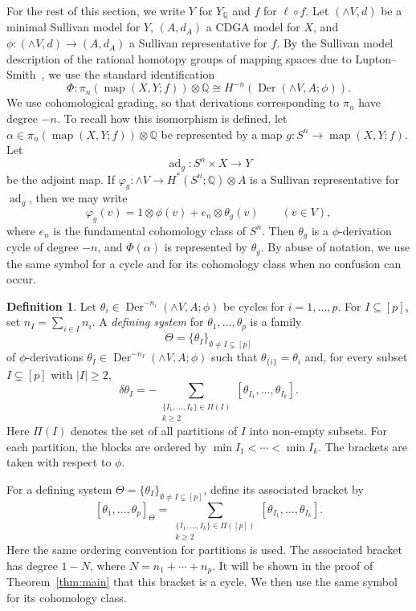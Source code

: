 \documentclass[a4paper,10pt]{amsart}
\theoremstyle{definition}
\newtheorem{defn}[thm]{Definition}
\theoremstyle{remark}
\newcommand{\map}{\operatorname{map}}
\newcommand{\Der}{\operatorname{Der}}
\newcommand{\ad}{\operatorname{ad}}
\numberwithin{equation}{section}
\begin{document}
For the rest of this section, we write $Y$ for $Y_{\mathbb Q}$ and $f$ for
$\ell\circ f$. Let $(\wedge V,d)$ be a minimal Sullivan model for $Y$,
$(A,d_A)$ a CDGA model for $X$, and $\phi : (\wedge V,d) \to (A,d_A)$ a Sullivan representative for $f$.
By the Sullivan model description of the rational homotopy groups of mapping
spaces due to Lupton--Smith~\cite[Theorem~2.1]{LS2007}, we use the standard
identification
\begin{equation}\label{eq:adjoint-derivation-isomorphism}
        \Phi:\pi_n(\map(X,Y;f))\otimes\mathbb{Q}
        \cong
        H^{-n}(\Der(\wedge V,A;\phi)).
\end{equation}
We use cohomological grading, so that derivations corresponding to $\pi_n$
have degree $-n$.
To recall how this isomorphism is defined, let
$
\alpha\in \pi_n(\map(X,Y;f))\otimes\mathbb{Q}
$
be represented by a map
$
g:S^n\to\map(X,Y;f).
$
Let
\[
        \ad_g:S^n\times X\longrightarrow Y
\]
be the adjoint map. If
$
\varphi_g:\wedge V\to H^*(S^n;\mathbb{Q})\otimes A
$
is a Sullivan representative for $\ad_g$, then we may write
\[
        \varphi_g(v)
        =
        1\otimes \phi(v)+e_n\otimes \theta_g(v)
        \qquad (v\in V),
\]
where $e_n$ is the fundamental cohomology class of $S^n$. Then $\theta_g$ is a
$\phi$-derivation cycle of degree $-n$, and $\Phi(\alpha)$ is represented by
$\theta_g$. By abuse of notation, we use the same symbol for a cycle and for
its cohomology class when no confusion can occur.


\begin{defn}\label{def:defining-system}
Let $\theta_i\in\Der^{-n_i}(\wedge V,A;\phi)$ be cycles for
$i=1,\ldots,p$. For $I\subseteq[p]$, set
$n_I=\sum_{i\in I}n_i$.
A \emph{defining system} for $\theta_1,\ldots,\theta_p$ is a family
\[
        \Theta=\{\theta_I\}_{\emptyset\neq I\subsetneq[p]}
\]
of $\phi$-derivations
$
\theta_I\in \Der^{-n_I}(\wedge V,A;\phi)
$
such that $\theta_{\{i\}}=\theta_i$ and, for every subset
$I\subsetneq[p]$ with $|I|\geq 2$,
\[
\delta\theta_I
=
-
\sum_{\substack{\{I_1,\ldots,I_k\}\in\Pi(I)\\ k\geq 2}}
[
\theta_{I_1},\ldots,\theta_{I_k}
].
\]
Here $\Pi(I)$ denotes the set of all partitions of $I$ into non-empty subsets.
For each partition, the blocks are ordered by
$
\min I_1<\cdots<\min I_k.
$
The brackets are taken with respect to $\phi$.
\end{defn}



For a defining system
$\Theta=\{\theta_I\}_{\emptyset\neq I\subsetneq[p]}$, define its associated bracket by
\[
[\theta_1,\ldots,\theta_p]_\Theta
=
\sum_{\substack{
\{I_1,\ldots,I_k\}\in\Pi([p])\\
k\geq2}}
[\theta_{I_1},\ldots,\theta_{I_k}].
\]
Here the same ordering convention for partitions is used.
The associated bracket has degree $1-N$, where
$N=n_1+\cdots+n_p$.
It will be shown in the proof of Theorem~\ref{thm:main} that this bracket is
a cycle. We then use the same symbol for its cohomology class.
\end{document}
